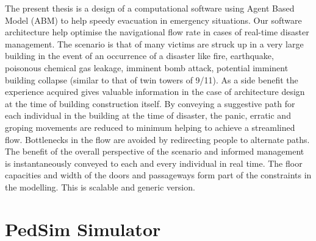 The present thesis is a design of a computational software using Agent Based Model (ABM) to help speedy evacuation in emergency situations. Our software architecture help optimise the navigational flow rate in cases of real-time disaster management. The scenario is that of many victims are struck up in a very large building in the event of an occurrence of a disaster like fire, earthquake, poisonous chemical gas leakage, imminent bomb attack, potential imminent building collapse (similar to that of twin towers of 9/11). As a side benefit the experience acquired gives valuable information in the case of architecture design at the time of building construction itself. By conveying a suggestive path for each individual in the building at the time of disaster, the panic, erratic and groping movements are reduced to minimum helping to achieve a streamlined flow. Bottlenecks in the flow are avoided by redirecting people to alternate paths. The benefit of the overall perspective of the scenario and informed management is instantaneously conveyed to each and every individual in real time. The floor capacities and width of the doors and passageways form part of the constraints in the modelling. This is scalable and generic version.

\section{PedSim Simulator}
\label{sec:intro:PedSim Simulator}

